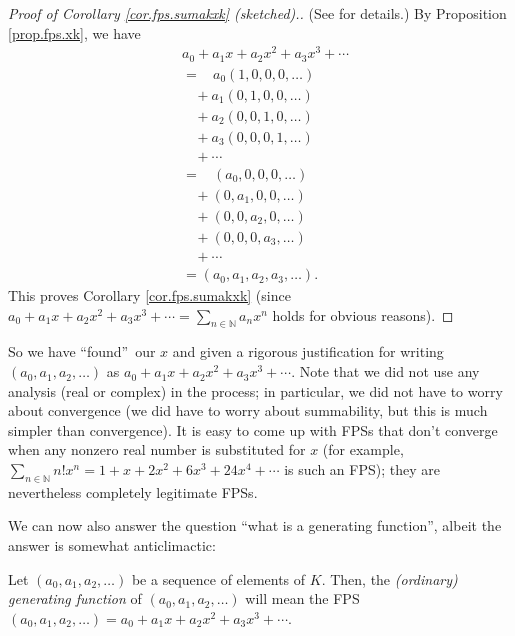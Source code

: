 \begin{proof}
[Proof of Corollary \ref{cor.fps.sumakxk} (sketched).](See \cite[Corollary
7.2.16]{19s} for details.) By Proposition \ref{prop.fps.xk}, we have%
\begin{align*}
&  a_{0}+a_{1}x+a_{2}x^{2}+a_{3}x^{3}+\cdots\\
&  =\ \ \ \ a_{0}\left(  1,0,0,0,\ldots\right) \\
&  \ \ \ \ +a_{1}\left(  0,1,0,0,\ldots\right) \\
&  \ \ \ \ +a_{2}\left(  0,0,1,0,\ldots\right) \\
&  \ \ \ \ +a_{3}\left(  0,0,0,1,\ldots\right) \\
&  \ \ \ \ +\cdots\\
&  =\ \ \ \ \left(  a_{0},0,0,0,\ldots\right) \\
&  \ \ \ \ +\left(  0,a_{1},0,0,\ldots\right) \\
&  \ \ \ \ +\left(  0,0,a_{2},0,\ldots\right) \\
&  \ \ \ \ +\left(  0,0,0,a_{3},\ldots\right) \\
&  \ \ \ \ +\cdots\\
&  =\left(  a_{0},a_{1},a_{2},a_{3},\ldots\right)  .
\end{align*}
This proves Corollary \ref{cor.fps.sumakxk} (since $a_{0}+a_{1}x+a_{2}%
x^{2}+a_{3}x^{3}+\cdots=\sum_{n\in\mathbb{N}}a_{n}x^{n}$ holds for obvious reasons).
\end{proof}

So we have \textquotedblleft found\textquotedblright\ our $x$ and given a
rigorous justification for writing $\left(  a_{0},a_{1},a_{2},\ldots\right)  $
as $a_{0}+a_{1}x+a_{2}x^{2}+a_{3}x^{3}+\cdots$. Note that we did not use any
analysis (real or complex) in the process; in particular, we did not have to
worry about convergence (we did have to worry about summability, but this is
much simpler than convergence). It is easy to come up with FPSs that don't
converge when any nonzero real number is substituted for $x$ (for example,
$\sum_{n\in\mathbb{N}}n!x^{n}=1+x+2x^{2}+6x^{3}+24x^{4}+\cdots$ is such an
FPS); they are nevertheless completely legitimate FPSs.

We can now also answer the question \textquotedblleft what is a generating
function\textquotedblright, albeit the answer is somewhat anticlimactic:

\begin{definition}
Let $\left(  a_{0},a_{1},a_{2},\ldots\right)  $ be a sequence of elements of
$K$. Then, the \emph{(ordinary) generating function} of $\left(  a_{0}%
,a_{1},a_{2},\ldots\right)  $ will mean the FPS $\left(  a_{0},a_{1}%
,a_{2},\ldots\right)  =a_{0}+a_{1}x+a_{2}x^{2}+a_{3}x^{3}+\cdots$.
\end{definition}


